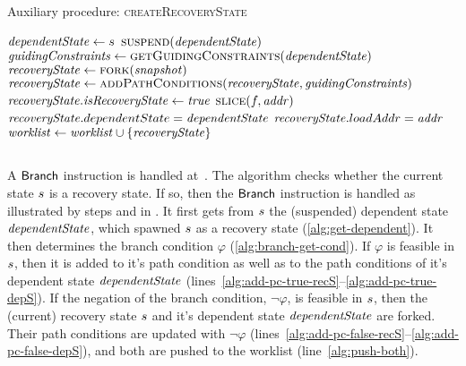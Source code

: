 \begin{algorithm}
  \caption{Auxiliary procedure: \textsc{createRecoveryState}
  \label{fig:aux-create-recovery-state}}
\begin{algorithmic}[1]

   \label{alg:recover-foreach}
     \label{alg:recover-if-found}
       \State $\mathit{dependentState} \gets s$ \label{alg:recover-gen-depS}
       \State $\Call{suspend}{\dependentState}$ \label{alg:recover-suspend}
       \State $\gc \gets  \Call{getGuidingConstraints}{\dependentState}$ \label{alg:recover-get-gc}
       \State $\recoveryState \gets \Call{fork}{\snapshot}$ \label{alg:recover-gen-recS}
       \State $\recoveryState \gets \Call{addPathConditions}{\recoveryState,\gc}$ \label{alg:add-guiding-constraints}
       \State $\mathit{recoveryState}.\mathit{isRecoveryState} \gets \mathit{true}$ \label{alg:recover-set-is-recS}
       \State $\Call{slice}{f,\addr}$ \label{alg:recover-slice}
       \State $\mathit{recoveryState}.dependentState = \mathit{dependentState}$ \label{alg:set-dependent-state}
       \State $\mathit{recoveryState}.loadAddr = \mathit{addr}$ \label{alg:set-load-addr}
       \State $\mathit{worklist} \gets \mathit{worklist} \cup \{\mathit{recoveryState}\}$
       \label{alg:push-worklist-recovery}
    \EndIf
  \EndFor
\EndFunction
\end{algorithmic}
\end{algorithm}

\subsection{}

A $\mathsf{Branch}$ instruction is handled at~.
The algorithm checks whether the current state $s$ is a recovery state.
If so, then the $\mathsf{Branch}$ instruction is
handled as illustrated by steps  and  in .
It first gets from $s$ the (suspended) dependent state $\mathit{dependentState}$,
which spawned $s$ as a recovery state (\cref{alg:get-dependent}).
It then determines the branch condition $\varphi$ (\cref{alg:branch-get-cond}).
If $\varphi$ is feasible in $s$,
then it is added to it's path condition as well as to the path conditions
of it's dependent state $\mathit{dependentState}$ (lines~\ref{alg:add-pc-true-recS}--\ref{alg:add-pc-true-depS}).
If the negation of the branch condition, $\neg \varphi$, is feasible in $s$,
then the (current) recovery state $s$ and it's dependent state $\mathit{dependentState}$ are forked.
Their path conditions are updated with $\neg \varphi$ (lines~\ref{alg:add-pc-false-recS}--\ref{alg:add-pc-false-depS}),
and both are pushed to the worklist (line~\ref{alg:push-both}).

